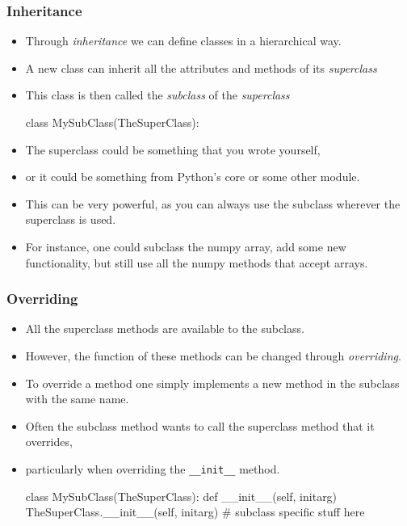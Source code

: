 \documentclass{beamer}
\begin{document}
\begin{frame}[fragile]
\frametitle{Inheritance}
\begin{itemize}
\item Through \emph{inheritance} we can define classes in a hierarchical way.
\pause
\item A new class can inherit all the attributes and methods of its \emph{superclass}
\item This class is then called the \emph{subclass} of the \emph{superclass}
\begin{code}
  class MySubClass(TheSuperClass):
\end{code}
\pause
\item The superclass could be something that you wrote yourself,
\item or it could be something from Python's core or some other module.
\pause
\item This can be very powerful, as you can always use the subclass wherever the superclass is used.
\pause
\item For instance, one could subclass the numpy array, add some new functionality, 
but still use all the numpy methods that accept arrays.
\end{itemize}

\end{frame}

\begin{frame}[fragile]
\frametitle{Overriding}

\begin{itemize}
\item All the superclass methods are available to the subclass.
\item However, the function of these methods can be changed through \emph{overriding}.
\item To override a method one simply implements a new method in the subclass with the same name.
\item Often the subclass method wants to call the superclass method that it overrides,
\item particularly when overriding the \lstinline|__init__| method.
\begin{code}
  class MySubClass(TheSuperClass):
    def __init__(self, initarg)
      TheSuperClass.__init__(self, initarg)
      # subclass specific stuff here
\end{code}
\end{itemize}

\end{frame}
\end{document}
